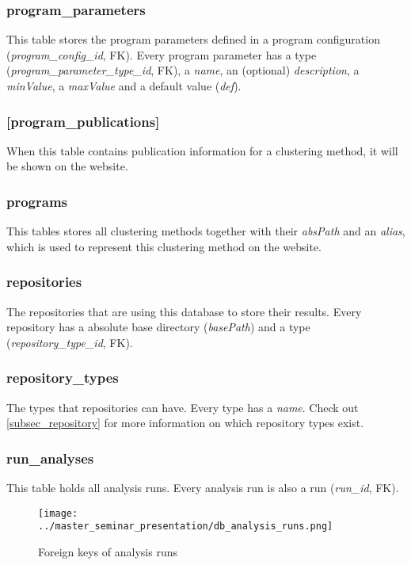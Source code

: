 	\subsubsection{program\_parameters}
	This table stores the program parameters defined in a program configuration (\textit{program\_config\_id}, FK). Every program parameter has a type (\textit{program\_parameter\_type\_id}, FK), a \textit{name}, an (optional) \textit{description}, a \textit{minValue}, a \textit{maxValue} and a default value (\textit{def}).
		
	\subsubsection{[program\_publications]}		
	When this table contains publication information for a clustering method, it will be shown on the website.
	
	\subsubsection{programs}
	This tables stores all clustering methods together with their \textit{absPath} and an \textit{alias}, which is used to represent this clustering method on the website.
	
	\subsubsection{repositories}
	The repositories that are using this database to store their results. Every repository has a absolute base directory (\textit{basePath}) and a type (\textit{repository\_type\_id}, FK).
		
	\subsubsection{repository\_types}
	The types that repositories can have. Every type has a \textit{name}. Check out \ref{subsec_repository} for more information on which repository types exist.
	
	\subsubsection{run\_analyses}
	This table holds all analysis runs. Every analysis run is also a run (\textit{run\_id}, FK).

\begin{figure}[hbtp]
\caption{Foreign keys of analysis runs}
\label{fig_analysis_runs_foreign_keys}
\centering
\texttt{[image: ../master\_seminar\_presentation/db\_analysis\_runs.png]}
\end{figure} 
	

